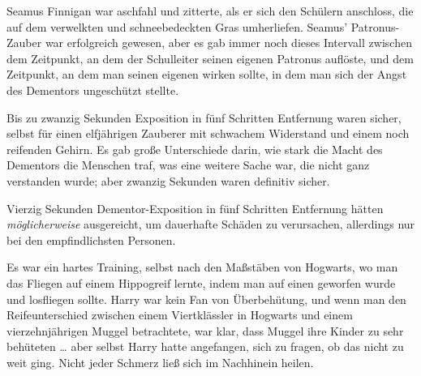 \later

Seamus Finnigan war aschfahl und zitterte, als er sich den Schülern anschloss, die auf dem verwelkten und schneebedeckten Gras umherliefen. Seamus’ Patronus-Zauber war erfolgreich gewesen, aber es gab immer noch dieses Intervall zwischen dem Zeitpunkt, an dem der Schulleiter seinen eigenen Patronus auflöste, und dem Zeitpunkt, an dem man seinen eigenen wirken sollte, in dem man sich der Angst des Dementors ungeschützt stellte.

Bis zu zwanzig Sekunden Exposition in fünf Schritten Entfernung waren sicher, selbst für einen elfjährigen Zauberer mit schwachem Widerstand und einem noch reifenden Gehirn. Es gab große Unterschiede darin, wie stark die Macht des Dementors die Menschen traf, was eine weitere Sache war, die nicht ganz verstanden wurde; aber zwanzig Sekunden waren definitiv sicher.

Vierzig Sekunden Dementor-Exposition in fünf Schritten Entfernung hätten \emph{möglicherweise} ausgereicht, um dauerhafte Schäden zu verursachen, allerdings nur bei den empfindlichsten Personen.

Es war ein hartes Training, selbst nach den Maßstäben von Hogwarts, wo man das Fliegen auf einem Hippogreif lernte, indem man auf einen geworfen wurde und losfliegen sollte. Harry war kein Fan von Überbehütung, und wenn man den Reifeunterschied zwischen einem Viertklässler in Hogwarts und einem vierzehnjährigen Muggel betrachtete, war klar, dass Muggel ihre Kinder zu sehr behüteten … aber selbst Harry hatte angefangen, sich zu fragen, ob das nicht zu weit ging. Nicht jeder Schmerz ließ sich im Nachhinein heilen.

